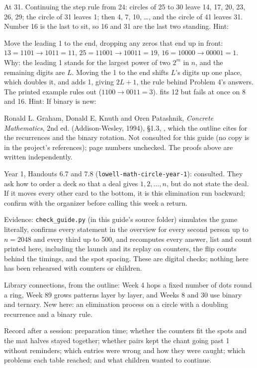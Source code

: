 At 31. Continuing the step rule from 24: circles of 25 to 30 leave 14, 17, 20, 23, 26, 29; the circle of 31 leaves 1; then 4, 7, 10, \dots, and the circle of 41 leaves 31. Number 16 is the last to sit, so 16 and 31 are the last two standing. Hint: 

Move the leading 1 to the end, dropping any zeros that end up in front: $13=1101\to1011=11$, $25=11001\to10011=19$, $16=10000\to00001=1$. Why: the leading 1 stands for the largest power of two $2^m$ in $n$, and the remaining digits are $L$. Moving the 1 to the end shifts $L$'s digits up one place, which doubles it, and adds 1, giving $2L+1$, the rule behind Problem 4's answers. The printed example rules out  ($1100\to0011=3$).  fits 12 but fails at once on 8 and 16. Hint:  If binary is new: 

Ronald L. Graham, Donald E. Knuth and Oren Patashnik, \emph{Concrete Mathematics}, 2nd ed. (Addison-Wesley, 1994), \S1.3, , which the outline cites for the recurrences and the binary rotation. Not consulted for this guide (no copy is in the project's references); page numbers unchecked. The proofs above are written independently.

Year 1, Handouts 6.7 and 7.8 (\texttt{lowell-math-circle-year-1}): consulted. They ask how to order a deck so that a deal gives $1,2,\dots,n$, but do not state the deal. If it moves every other card to the bottom, it is this elimination run backward; confirm with the organizer before calling this week a return.

Evidence: \texttt{check\_guide.py} (in this guide's source folder) simulates the game literally, confirms every statement in the overview for every second person up to $n=2048$ and every third up to 500, and recomputes every answer, list and count printed here, including the launch and its replay on counters, the flip counts behind the timings, and the spot spacing. These are digital checks; nothing here has been rehearsed with counters or children.

Library connections, from the outline: Week 4 hops a fixed number of dots round a ring, Week 89 grows patterns layer by layer, and Weeks 8 and 30 use binary and ternary. New here: an elimination process on a circle with a doubling recurrence and a binary rule.

Record after a session: preparation time; whether the counters fit the spots and the mat halves stayed together; whether pairs kept the chant going past 1 without reminders; which entries were wrong and how they were caught; which problems each table reached; and what children wanted to continue.
